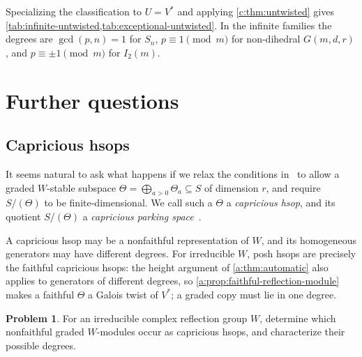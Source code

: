 \documentclass[11pt]{amsart}
\newcommand{\defn}[1]{\emph{\color{darkblue}#1}}
\theoremstyle{definition}
\newtheorem{problem}[theorem]{Problem}
\begin{document}
Specializing the classification to $U=V^*$ and applying
\cref{c:thm:untwisted} gives
\cref{tab:infinite-untwisted,tab:exceptional-untwisted}. In the infinite
families the degrees are $\gcd(p,n)=1$ for $S_n$, $p\equiv1\pmod m$
for non-dihedral $G(m,d,r)$, and $p\equiv\pm1\pmod m$ for $I_2(m)$.

\section{Further questions}
\label{sec:questions}\label{sec:beyond-hsops}

\subsection{Capricious hsops}

It seems natural to ask what happens if we relax the conditions in~ to allow a graded $W$-stable subspace
$\Theta=\bigoplus_{a>0}\Theta_a\subseteq S$ of dimension $r$, and
require $S/(\Theta)$ to be finite-dimensional. We call such a $\Theta$ a
\defn{capricious hsop}, and its quotient $S/(\Theta)$ a
\defn{capricious parking space}~\cite[Section~6, p.~1274]{KonheimWeiss}.

A capricious hsop may be a nonfaithful representation of $W$, and its
homogeneous generators may have different degrees. For irreducible $W$, posh hsops are
precisely the faithful capricious hsops: the height argument of
\cref{a:thm:automatic} also applies to generators of different degrees,
so \cref{a:prop:faithful-reflection-module} makes a faithful $\Theta$
a Galois twist of $V^*$; a graded copy must lie in one degree.

\begin{problem}\label{prob:nonfaithful-hsops}
For an irreducible complex reflection group $W$, determine which
nonfaithful graded $W$-modules occur as capricious hsops,
and characterize their possible degrees.
\end{problem}

\end{document}
